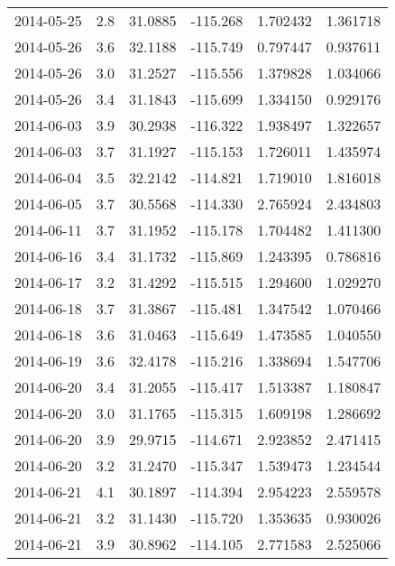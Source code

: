 \begin{tabular}{lrrrrr}
2014-05-25 &       2.8 &  31.0885 &  -115.268 &         1.702432 &         1.361718 \\
2014-05-26 &       3.6 &  32.1188 &  -115.749 &         0.797447 &         0.937611 \\
2014-05-26 &       3.0 &  31.2527 &  -115.556 &         1.379828 &         1.034066 \\
2014-05-26 &       3.4 &  31.1843 &  -115.699 &         1.334150 &         0.929176 \\
2014-06-03 &       3.9 &  30.2938 &  -116.322 &         1.938497 &         1.322657 \\
2014-06-03 &       3.7 &  31.1927 &  -115.153 &         1.726011 &         1.435974 \\
2014-06-04 &       3.5 &  32.2142 &  -114.821 &         1.719010 &         1.816018 \\
2014-06-05 &       3.7 &  30.5568 &  -114.330 &         2.765924 &         2.434803 \\
2014-06-11 &       3.7 &  31.1952 &  -115.178 &         1.704482 &         1.411300 \\
2014-06-16 &       3.4 &  31.1732 &  -115.869 &         1.243395 &         0.786816 \\
2014-06-17 &       3.2 &  31.4292 &  -115.515 &         1.294600 &         1.029270 \\
2014-06-18 &       3.7 &  31.3867 &  -115.481 &         1.347542 &         1.070466 \\
2014-06-18 &       3.6 &  31.0463 &  -115.649 &         1.473585 &         1.040550 \\
2014-06-19 &       3.6 &  32.4178 &  -115.216 &         1.338694 &         1.547706 \\
2014-06-20 &       3.4 &  31.2055 &  -115.417 &         1.513387 &         1.180847 \\
2014-06-20 &       3.0 &  31.1765 &  -115.315 &         1.609198 &         1.286692 \\
2014-06-20 &       3.9 &  29.9715 &  -114.671 &         2.923852 &         2.471415 \\
2014-06-20 &       3.2 &  31.2470 &  -115.347 &         1.539473 &         1.234544 \\
2014-06-21 &       4.1 &  30.1897 &  -114.394 &         2.954223 &         2.559578 \\
2014-06-21 &       3.2 &  31.1430 &  -115.720 &         1.353635 &         0.930026 \\
2014-06-21 &       3.9 &  30.8962 &  -114.105 &         2.771583 &         2.525066 \\

\end{tabular}
